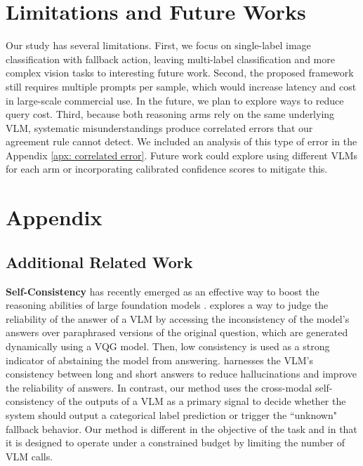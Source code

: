 \documentclass[10pt]{article} %
\begin{document}
\section{Limitations and Future Works}\label{sec:limitation}
Our study has several limitations. First, we focus on single-label image classification with fallback action, leaving multi-label classification and more complex vision tasks to interesting future work. Second, the proposed framework still requires multiple prompts per sample, which would increase latency and cost in large-scale commercial use. In the future, we plan to explore ways to reduce query cost. Third, because both reasoning arms rely on the same underlying VLM, systematic misunderstandings produce correlated errors that our agreement rule cannot detect. We included an analysis of this type of error in the Appendix \ref{apx: correlated error}. Future work could explore using different VLMs for each arm or incorporating calibrated confidence scores to mitigate this.



\clearpage
\appendix
\section{Appendix}
\subsection{Additional Related Work} \label{sec:relatedwork}

\textbf{Self-Consistency} has recently emerged as an effective way to boost the reasoning abilities of large foundation models \cite{wang2022self}.
\cite{khan2024consistency} explores a way to judge the reliability of the answer of a VLM by accessing the inconsistency of the model’s answers over paraphrased versions of the original question, which are generated dynamically using a VQG model.
Then, low consistency is used as a strong indicator of abstaining the model from answering.
\cite{han2025self} harnesses the VLM's consistency between long and short answers to reduce hallucinations and improve the reliability of answers.
In contrast, our method uses the cross-modal self-consistency of the outputs of a VLM as a primary signal to decide whether the system should output a categorical label prediction or trigger the ``unknown" fallback behavior.
Our method is different in the objective of the task and in that it is designed to operate under a constrained budget by limiting the number of VLM calls.
\end{document}
